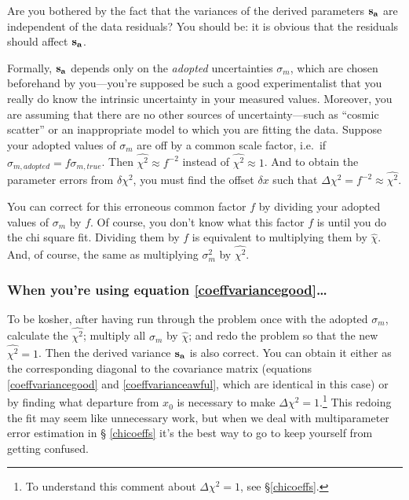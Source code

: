 \documentclass[psfig,preprint]{aastex}
\begin{document}
	Are you bothered by the fact that the variances of the derived
parameters ${\bf s_a}$ are independent of the data residuals? You should be:
it is obvious that the residuals should affect ${\bf s_a}$. 

        Formally, ${\bf s_a}$ depends only on the {\it adopted}
uncertainties $\sigma_{m}$, which are chosen beforehand by
you---you're supposed be such a good experimentalist that you really do
know the intrinsic uncertainty in your measured values.  Moreover, you
are assuming that there are no other sources of uncertainty---such as
``cosmic scatter'' or an inappropriate model to which you are fitting
the data.  Suppose your adopted values of $\sigma_{m}$ are off by a
common scale factor, i.e.\ if $\sigma_{m,adopted} =
f\sigma_{m,true}$.  Then $\widehat{\chi^2} \approx f^{-2}$ instead of
$\widehat{\chi^2} \approx 1$.  And to obtain the parameter errors from
$\delta \chi^2$, you must find the offset $\delta x$ such that $\Delta
\chi^2 = f^{-2} \approx \widehat{\chi^2}$. 

	You can correct for this erroneous common factor $f$ by dividing
your adopted values of $\sigma_{m}$ by $f$.  Of course, you don't
know what this factor $f$ is until you do the chi square fit.  Dividing
them by $f$ is equivalent to multiplying them by $\widehat{\chi}$.  And,
of course, the same as multiplying $\sigma_{m}^2$ by
$\widehat{\chi^2}$. 

\subsubsection{When you're using equation \ref{coeffvariancegood}\dots}
\label{diatrabetwo}

	To be kosher, after having run through the problem once with the
adopted $\sigma_{m}$, calculate the $\widehat{\chi^2}$; multiply all
$\sigma_{m}$ by $\widehat{\chi}$; and redo the problem so that the new
$\widehat{\chi^2} = 1$.  Then the derived variance ${\bf s_a}$ is also
correct.  You can obtain it either as the corresponding diagonal to the
covariance matrix (equations \ref{coeffvariancegood} and
\ref{coeffvarianceawful}, which are identical in this case) or by
finding what departure from $x_0$ is necessary to make $\Delta \chi^2 =
1$.\footnote{To understand this comment about $\Delta \chi^2 = 1$, see
\S \ref {chicoeffs}.} This redoing the fit may seem like unnecessary
work, but when we deal with multiparameter error estimation in \S
\ref{chicoeffs} it's the best way to go to keep yourself from getting
confused. 
\end{document}
